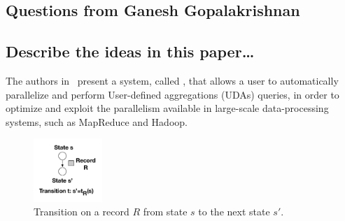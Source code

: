 


\begin{refsection}
\section{Questions from Ganesh Gopalakrishnan}
\label{sec:member1}

\subsection{Describe the ideas in this paper\dots}
\label{sec:member11}

The authors in~\cite{Raychev:2015:PUA:2815400.2815418} present a system,
called \symp, that allows a user to automatically parallelize and perform
User-defined aggregations (UDAs) queries, in order to optimize and exploit the
parallelism available in large-scale data-processing systems, such as
MapReduce and Hadoop.
%

\begin{figure}
  \centering
  \includegraphics[width=0.23\textwidth]{figures/symple_ex1}
  \caption{Transition on a record $R$ from state $s$ to the next state $s'$.}
  \label{fig:symple_ex1}
\end{figure}


\end{refsection}
